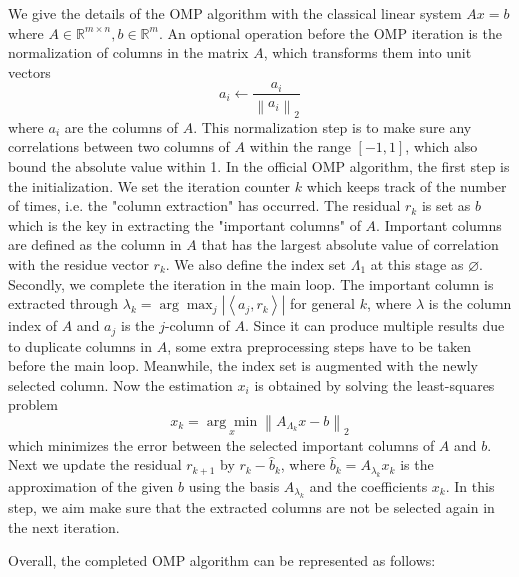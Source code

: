 \par We give the details of the OMP algorithm with the classical linear system $Ax = b$ where $A \in \mathbb{R}^{m \times n}, b \in \mathbb{R}^{m}$. An optional operation before the OMP iteration is the normalization of columns in the matrix $A$, which transforms them into unit vectors
\begin{equation}
    a_{i} \leftarrow \frac{a_{i}}{\left\|a_{i}\right\|_{2}}
\end{equation}
where $a_i$ are the columns of $A$. This normalization step is to make sure any correlations between two columns of $A$ within the range $[-1, 1]$, which also bound the absolute value within 1. In the official OMP algorithm, the first step is the initialization. We set the iteration counter $k$ which keeps track of the number of times, i.e. the "column extraction" has occurred. The residual $r_k$ is set as $b$ which is the key in extracting the "important columns" of $A$. Important columns are defined as the column in $A$ that has the largest absolute value of correlation with the residue vector ${r_k}$. We also define the index set $\Lambda_1$ at this stage as $\varnothing$. Secondly, we complete the iteration in the main loop. The important column is extracted through $\lambda_{k}=\arg \max _{j}\left|\left\langle a_{j}, r_{k}\right\rangle\right|$ for general $k$, where $\lambda$ is the column index of $A$ and $a_j$ is the $j$-column of $A$. Since it can produce multiple results due to duplicate columns in $A$, some extra preprocessing steps have to be taken before the main loop. Meanwhile, the index set is augmented with the newly selected column. Now the estimation $x_i$ is obtained by solving the least-squares problem
\begin{equation}
    x_{k}=\underset{x}{\arg \min }\left\|A_{\Lambda_{k}} x-b\right\|_{2}
\end{equation}
which minimizes the error between the selected important columns of $A$ and $b$. Next we update the residual $r_{k+1}$ by $r_k - \hat{b}_{k}$, where $\hat{b}_{k} = A_{\lambda_{k}} x_{k}$ is the approximation of the given $b$ using the basis $A_{\lambda_{k}}$ and the coefficients $x_{k}$. In this step, we aim make sure that the extracted columns are not be selected again in the next iteration. 
\par Overall, the completed OMP algorithm can be represented as follows:

